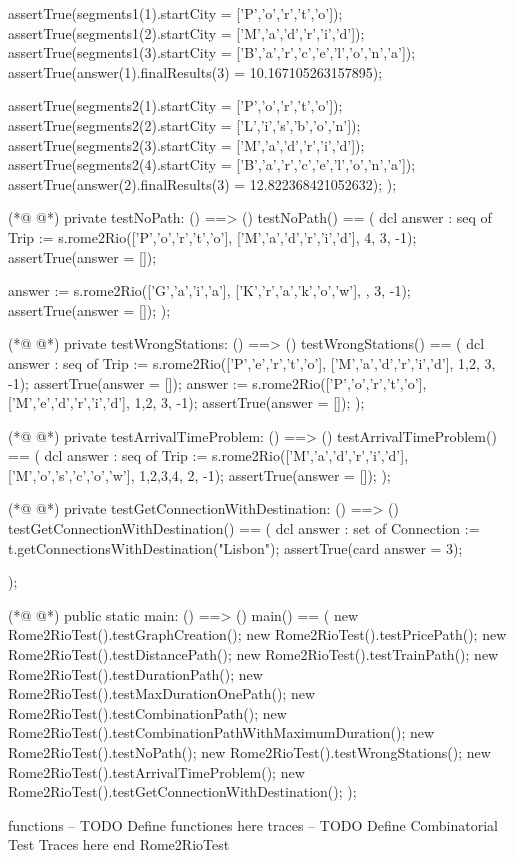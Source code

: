 \begin{vdmpp}[breaklines=true]
      assertTrue(segments1(1).startCity = ['P','o','r','t','o']);
      assertTrue(segments1(2).startCity = ['M','a','d','r','i','d']);
      assertTrue(segments1(3).startCity = ['B','a','r','c','e','l','o','n','a']);
      assertTrue(answer(1).finalResults(3) = 10.167105263157895);
      
      assertTrue(segments2(1).startCity = ['P','o','r','t','o']);
      assertTrue(segments2(2).startCity = ['L','i','s','b','o','n']);
      assertTrue(segments2(3).startCity = ['M','a','d','r','i','d']);
      assertTrue(segments2(4).startCity = ['B','a','r','c','e','l','o','n','a']);
      assertTrue(answer(2).finalResults(3) = 12.822368421052632);
    );
    
(*@
\label{testNoPath:118}
@*)
    private testNoPath: () ==> ()
    testNoPath() == (
      dcl answer : seq of Trip := s.rome2Rio(['P','o','r','t','o'], ['M','a','d','r','i','d'], {4}, 3, -1);
     assertTrue(answer = []);
     
     answer := s.rome2Rio(['G','a','i','a'], ['K','r','a','k','o','w'], {}, 3, -1);
     assertTrue(answer = []);
    );
    
(*@
\label{testWrongStations:127}
@*)
    private testWrongStations: () ==> ()
    testWrongStations() == (
      dcl answer : seq of Trip := s.rome2Rio(['P','e','r','t','o'], ['M','a','d','r','i','d'], {1,2}, 3, -1);
     assertTrue(answer = []);
     answer := s.rome2Rio(['P','o','r','t','o'], ['M','e','d','r','i','d'], {1,2}, 3, -1);
     assertTrue(answer = []);
    );
    
(*@
\label{testArrivalTimeProblem:135}
@*)
    private testArrivalTimeProblem: () ==> ()
    testArrivalTimeProblem() == (
      dcl answer : seq of Trip := s.rome2Rio(['M','a','d','r','i','d'], ['M','o','s','c','o','w'], {1,2,3,4}, 2, -1);
     assertTrue(answer = []);
    );
    
(*@
\label{testGetConnectionWithDestination:141}
@*)
    private testGetConnectionWithDestination: () ==> ()
    testGetConnectionWithDestination() == (
      dcl answer : set of Connection := t.getConnectionsWithDestination("Lisbon");
     assertTrue(card answer = 3);
     
    );
        
(*@
\label{main:148}
@*)
    public static main: () ==> ()
    main() == (
      new Rome2RioTest().testGraphCreation();
      new Rome2RioTest().testPricePath();
      new Rome2RioTest().testDistancePath();
      new Rome2RioTest().testTrainPath();
      new Rome2RioTest().testDurationPath();
      new Rome2RioTest().testMaxDurationOnePath();
      new Rome2RioTest().testCombinationPath();
      new Rome2RioTest().testCombinationPathWithMaximumDuration();
      new Rome2RioTest().testNoPath();
      new Rome2RioTest().testWrongStations();
      new Rome2RioTest().testArrivalTimeProblem();
      new Rome2RioTest().testGetConnectionWithDestination();
   );
   
functions
-- TODO Define functiones here
traces
-- TODO Define Combinatorial Test Traces here
end Rome2RioTest
\end{vdmpp}
